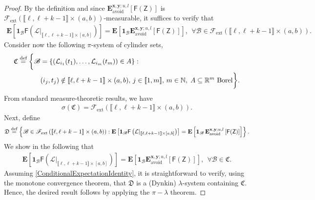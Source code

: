 \documentclass[]{article}
\begin{document}
\begin{proof}
By the definition and since
$ \mathbf{E}_{\mathrm{avoid}}^{\mathbf{x}, \mathbf{y}; u, l}\left[\mathsf{F}(\mathsf{Z})\right]
$
is  $\mathscr{F}_{\mathrm{ext}}\left(\llbracket \ell, \ell+k-1\rrbracket \times (a,b)\right)$-measurable,
it suffices to  verify that
\begin{align*}
\mathbf{E}\left[\mathbf{1}_{\mathscr{B}}\mathsf{F}\left(\mathcal{L}|_{\llbracket \ell, \ell+k-1 \rrbracket \times [a,b]}\right)\right] = \mathbf{E}\left[\mathbf{1}_{\mathscr{B}}\mathbf{E}_{\mathrm{avoid}}^{\mathbf{x},\mathbf{y};u,l}\left[\mathsf{F}(\mathsf{Z})\right]\right],
    \  \ \forall \mathscr{B}\in\mathscr{F}_{\mathrm{ext}}\left(\llbracket \ell, \ell+k-1\rrbracket \times (a,b)\right).
\end{align*}
Consider now the following $\pi$-system of cylinder sets,
\begin{align*}
\mathfrak{C} \overset{\textnormal{def}}{=}  \bigg\{ \mathscr{B}&=
\left\{\left (\mathcal{L}_{i_1}(t_1), \ldots, \mathcal{L}_{i_m}(t_m)\right) \in A \right\}: \\
&(i_j,t_j) \notin \llbracket \ell, \ell+k-1 \rrbracket \times (a,b),\,j\in\llbracket 1,m\rrbracket,\,
m\in\mathbb{N},\; A \subseteq \mathbb{R}^m \textnormal{ Borel}\bigg\}.
\end{align*}
From standard measure-theoretic results, we have 
\begin{align*}
\sigma\left(\mathfrak{C}\right)=\mathscr{F}_{\mathrm{ext}}\left(\llbracket \ell, \ell+k-1 \rrbracket \times (a,b)\right).
\end{align*}
Next, define
\begin{align*}
\mathfrak{D} \overset{\textnormal{def}}{=}  \left\{ \mathscr{B}\in \mathscr{F}_{\mathrm{ext}}\left(\llbracket \ell, \ell+k-1 \rrbracket \times (a,b)\right): \mathbf{E}\left[\mathbf{1}_{\mathscr{B}}\mathsf{F}\left(\mathcal{L}|_{\llbracket \ell, \ell+k-1\rrbracket \times [a,b]}\right)\right] = \mathbf{E}\left[\mathbf{1}_{\mathscr{B}}\, \mathbf{E}_{\mathrm{avoid}}^{\mathbf{x},\mathbf{y};u,l}\left[\mathsf{F}(\mathsf{Z})\right]\right] \right\}.
\end{align*}
We show in the following that
\begin{align}\label{ConditionalExpectationIdentity}
\mathbf{E}\left[\mathbf{1}_{\mathscr{B}}\mathsf{F}\left(\mathcal{L}|_{\llbracket \ell, \ell+k-1 \rrbracket \times [a,b]}\right)\right] = \mathbf{E}\left[\mathbf{1}_{\mathscr{B}}\mathbf{E}_{\mathrm{avoid}}^{\mathbf{x},\mathbf{y};u,l}\left[\mathsf{F}(\mathsf{Z})\right]\right],
    \  \ \forall \mathscr{B}\in\mathfrak{C}.
\end{align}
Assuming \eqref{ConditionalExpectationIdentity}, it is straightforward to verify, using the monotone convergence theorem, that \(\mathfrak{D}\) is a (Dynkin) \(\lambda\)-system containing $\mathfrak{C}$. Hence, the desired result follows by
applying the %
$\pi-\lambda$ theorem.


\end{proof}
\end{document}
